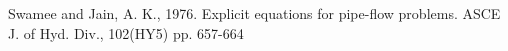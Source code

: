 \documentclass[12pt]{article}
\begin{document}
\begin{enumerate}
%

\end{enumerate}
\clearpage
\begin{thebibliography}{}

Swamee and Jain, A. K., 1976. Explicit equations for pipe-flow problems.  ASCE J. of Hyd. Div., 102(HY5) pp. 657-664 


\end{thebibliography}
\end{document}
